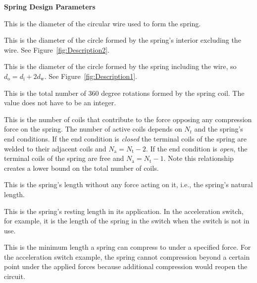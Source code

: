 \documentclass[10pt]{article}
\begin{document}
		\begin{center}\textbf{Spring Design Parameters}\end{center}
		\begin{description}[leftmargin=!,labelwidth=\widthof{\bfseries Young's Modulus (E)}]
		
			\item [Wire Diameter ($\boldsymbol{d}_{\text{w}}$)] This is the diameter of the circular wire used to form the spring.
		
			\item [Inner Diameter ($\boldsymbol{d}_{\text{i}}$)] This is the diameter of the circle formed by the spring's interior excluding the wire. See Figure~\ref{fig:Description2}.
			
			\item [Outer Diameter ($\boldsymbol{d}_{\text{o}}$)] This is the diameter of the circle formed by the spring including the wire, so ${d_{\text{o}} = d_{\text{i}} + 2d_{\text{w}}}$. See Figure~\ref{fig:Description1}.
			
			\item[Total Coils ($\boldsymbol{N}_{\text{t}}$)] This is the total number of 360 degree rotations formed by the spring coil. The value does not have to be an integer. 
			
			\item[Active Coils ($\boldsymbol{N}_{\text{a}}$)] This is the number of coils that contribute to the force opposing any compression force on the spring. The number of active coils depends on $N_{t}$ and the spring's end conditions. If the end condition is \textit{closed} the terminal coils of the spring are welded to their adjacent coils and $N_{\text{a}} = N_{\text{t}}-2$. If the end condition is \textit{open}, the terminal coils of the spring are free and $N_{\text{a}} = N_{\text{t}}-1$. Note this relationship creates a lower bound on the total number of coils.

			\item[Free Length ($\boldsymbol{L}_{\text{free}}$)] This is the spring's length without any force acting on it, i.e., the spring's natural length.
						
			\item[Open Length ($\boldsymbol{L}_{\text{open}}$)] This is the spring's resting length in its application. In the acceleration switch, for example, it is the length of the spring in the switch when the switch is not in use. 
						
			\item[Hard Length ($\boldsymbol{L}_{\text{hard}}$)] This is the minimum length a spring can compress to under a specified force. For the acceleration switch example, the spring cannot compression beyond a certain point under the applied forces because additional compression would reopen the circuit.
			

\end{description}
\end{document}
